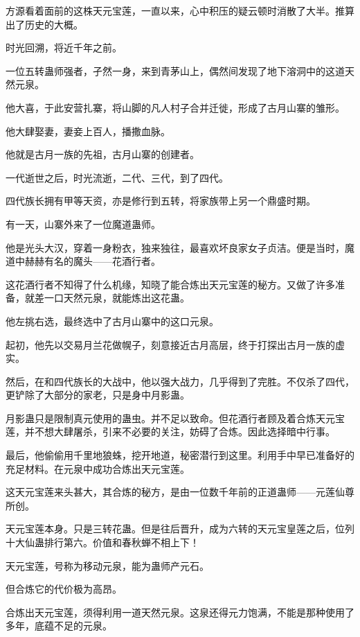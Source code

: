 
\begin{this_body}



方源看着面前的这株天元宝莲，一直以来，心中积压的疑云顿时消散了大半。推算出了历史的大概。

时光回溯，将近千年之前。

一位五转蛊师强者，孑然一身，来到青茅山上，偶然间发现了地下溶洞中的这道天然元泉。

他大喜，于此安营扎寨，将山脚的凡人村子合并迁徙，形成了古月山寨的雏形。

他大肆娶妻，妻妾上百人，播撒血脉。

他就是古月一族的先祖，古月山寨的创建者。

一代逝世之后，时光流逝，二代、三代，到了四代。

四代族长拥有甲等天资，亦是修行到五转，将家族带上另一个鼎盛时期。

有一天，山寨外来了一位魔道蛊师。

他是光头大汉，穿着一身粉衣，独来独往，最喜欢坏良家女子贞洁。便是当时，魔道中赫赫有名的魔头——花酒行者。

这花酒行者不知得了什么机缘，知晓了能合炼出天元宝莲的秘方。又做了许多准备，就差一口天然元泉，就能炼出这花蛊。

他左挑右选，最终选中了古月山寨中的这口元泉。

起初，他先以交易月兰花做幌子，刻意接近古月高层，终于打探出古月一族的虚实。

然后，在和四代族长的大战中，他以强大战力，几乎得到了完胜。不仅杀了四代，更铲除了大部分的家老，只是身中月影蛊。

月影蛊只是限制真元使用的蛊虫。并不足以致命。但花酒行者顾及着合炼天元宝莲，并不想大肆屠杀，引来不必要的关注，妨碍了合炼。因此选择暗中行事。

最后，他偷偷用千里地狼蛛，挖开地道，秘密潜行到这里。利用手中早已准备好的充足材料。在元泉中成功合炼出天元宝莲。

这天元宝莲来头甚大，其合炼的秘方，是由一位数千年前的正道蛊师——元莲仙尊所创。

天元宝莲本身。只是三转花蛊。但是往后晋升，成为六转的天元宝皇莲之后，位列十大仙蛊排行第六。价值和春秋蝉不相上下！

天元宝莲，号称为移动元泉，能为蛊师产元石。

但合炼它的代价极为高昂。

合炼出天元宝莲，须得利用一道天然元泉。这泉还得元力饱满，不能是那种使用了多年，底蕴不足的元泉。


\end{this_body}
